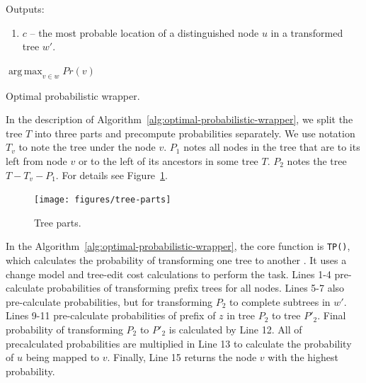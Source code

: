 Outputs: 

\begin{enumerate}
	\item $c$ -- the most probable location of a distinguished node $u$ in a transformed tree $w'$.
\end{enumerate}


\IncMargin{2em}
\begin{algorithm}

	\DontPrintSemicolon

	\BlankLine




	\Return $\operatorname*{arg\,max}_{v \in w} Pr(v)$ \;

	\caption{Optimal probabilistic wrapper.}
	\label{alg:optimal-probabilistic-wrapper}

\end{algorithm}
\DecMargin{2em}

In the description of Algorithm~\ref{alg:optimal-probabilistic-wrapper}, we split the tree $T$ into three parts and precompute probabilities separately. We use notation $T_v$ to note the tree under the node $v$. $P_1$ notes all nodes in the tree that are to its left from node $v$ or to the left of its ancestors in some tree $T$. $P_2$ notes the tree $T - T_v - P_1$. For details see Figure~\ref{fig:tree-parts}.

\begin{figure}[h]
	\centering
	\texttt{[image: figures/tree-parts]}
	\caption{Tree parts.}
	\label{fig:tree-parts}
\end{figure}

In the Algorithm~\ref{alg:optimal-probabilistic-wrapper}, the core function is \texttt{TP()}, which calculates the probability of transforming one tree to another \cite{dalvi2009a}. It uses a change model and tree-edit cost calculations to perform the task. Lines 1-4 pre-calculate probabilities of transforming prefix trees for all nodes. Lines 5-7 also pre-calculate probabilities, but for transforming $P_2$ to complete subtrees in $w'$. Lines 9-11 pre-calculate probabilities of prefix of $z$ in tree $P_2$ to tree $P'_2$. Final probability of transforming $P_2$ to $P'_2$ is calculated by Line 12. All of precalculated probabilities are multiplied in Line 13 to calculate the probability of $u$ being mapped to $v$. Finally, Line 15 returns the node $v$ with the highest probability.

